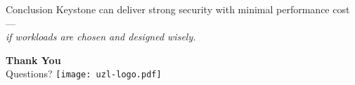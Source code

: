 \documentclass[aspectratio=169]{beamer}
\begin{document}
\begin{frame}{Conclusion}
\centering
\Large Keystone can deliver strong security with minimal performance cost — \\
\textit{if workloads are chosen and designed wisely.}
\end{frame}

\begin{frame}
\centering
\Huge\textbf{Thank You}\\
\large Questions? \faQuestionCircle
\vfill
\texttt{[image: uzl-logo.pdf]}
\end{frame}
\end{document}
